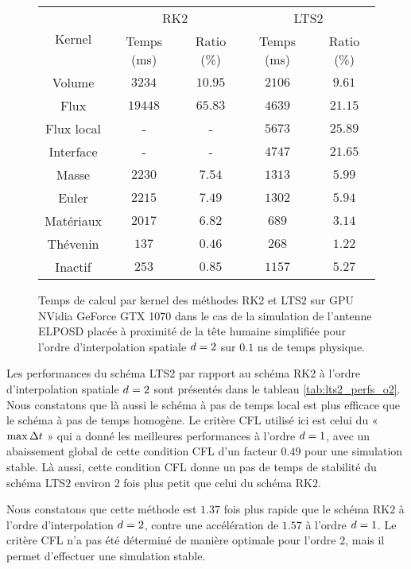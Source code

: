 \begin{figure}[!h]
	\centering
	\caption{
		\label{tab:lts2_ratios_o2}
		Temps de calcul par kernel des méthodes RK$2$ et LTS$2$
		sur GPU NVidia GeForce GTX 1070
		dans le cas de la simulation de l'antenne ELPOSD
		placée à proximité de la tête humaine simplifiée
		pour l'ordre d'interpolation spatiale $d = 2$
		sur $0.1$ ns de temps physique.
	}
	
	\begin{tabular}{|c|c|c|c|c|}
		\hline
		\multirow{2}{*}{Kernel} & \multicolumn{2}{c|}{RK$2$} & \multicolumn{2}{c|}{LTS$2$} \\	\cline{2-5}
		& Temps (ms) & Ratio (\%) & Temps (ms) & Ratio (\%) \\	\hline\hline
		Volume & $3234$ & $10.95$ & $2106$ & $9.61$ \\	\hline 
		Flux & $19448$ & $65.83$ & $4639$ & $21.15$ \\	\hline 
		Flux local & - & - & $5673$ & $25.89$ \\	\hline 
		Interface & - & - & $4747$ & $21.65$ \\	\hline 
		Masse & $2230$ & $7.54$ & $1313$ & $5.99$ \\	\hline 
		Euler & $2215$ & $7.49$ & $1302$ & $5.94$ \\	\hline 
		Matériaux & $2017$ & $6.82$ & $689$ & $3.14$ \\	\hline 
		Thévenin & $137$ & $0.46$ & $268$ & $1.22$ \\	\hline 
		Inactif & $253$ & $0.85$ & $1157$ & $5.27$ \\	\hline 
	\end{tabular}
\end{figure}


Les performances du schéma LTS$2$ par rapport au schéma RK$2$
à l'ordre d'interpolation spatiale $d=2$ sont présentés dans le tableau \ref{tab:lts2_perfs_o2}.
Nous constatons que là aussi le schéma à pas de temps local
est plus efficace que le schéma à pas de temps homogène.
Le critère CFL utilisé ici est celui du « $\max\Delta t$ » qui a donné les meilleures
performances à l'ordre $d=1$, avec un abaissement global de cette
condition CFL d'un facteur $0.49$ pour une simulation stable.
Là aussi, cette condition CFL donne un pas de temps
de stabilité du schéma LTS$2$ environ $2$ fois plus petit que celui du schéma RK$2$.

Nous constatons que cette méthode est $1.37$ fois plus rapide que le
schéma RK$2$ à l'ordre d'interpolation $d=2$, contre
une accélération de $1.57$ à l'ordre $d=1$.
Le critère CFL n'a pas été déterminé de manière optimale pour l'ordre $2$,
mais il permet d'effectuer une simulation stable.

